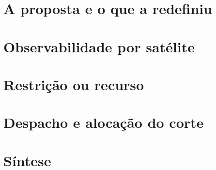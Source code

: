 \documentclass[10pt,a4paper,oneside,twocolumn]{book}
\begin{document}
\frontmatter
\onecolumn

\twocolumn
\tableofcontents


\mainmatter

\part{A proposta e o que a redefiniu}



\part{Observabilidade por satélite}


\part{Restrição ou recurso}



\part{Despacho e alocação do corte}




\part{Síntese}



\appendix
\onecolumn




\end{document}
